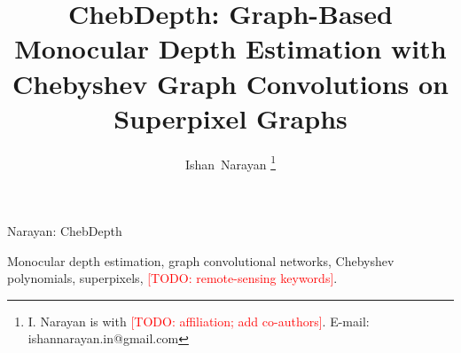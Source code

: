 \documentclass[journal]{IEEEtran}
\newcommand{\todo}[1]{\textcolor{red}{[TODO: #1]}}
\begin{document}
\title{ChebDepth: Graph-Based Monocular Depth Estimation with Chebyshev Graph Convolutions on Superpixel Graphs}

\author{Ishan~Narayan
\thanks{I. Narayan is with \todo{affiliation; add co-authors}. E-mail: ishannarayan.in@gmail.com}}

%
{Narayan: ChebDepth}

\maketitle

\begin{abstract}

\end{abstract}

\begin{IEEEkeywords}
Monocular depth estimation, graph convolutional networks, Chebyshev polynomials, superpixels, \todo{remote-sensing keywords}.
\end{IEEEkeywords}









\end{document}
